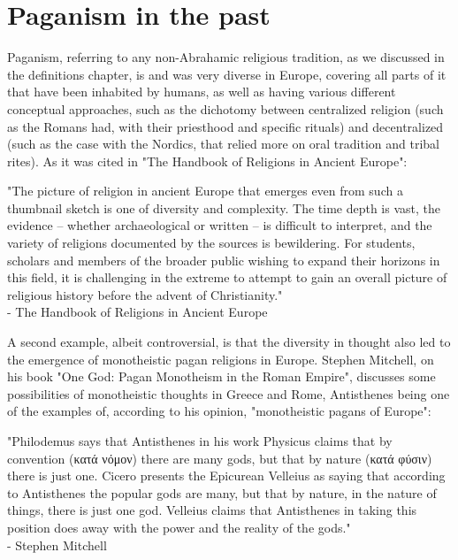 \section{Paganism in the past}
Paganism, referring to any non-Abrahamic religious tradition, as we discussed in the definitions
chapter, is and was very diverse in Europe, covering all parts of it that have been inhabited by
humans, as well as having various different conceptual approaches, such as the dichotomy between
centralized religion (such as the Romans had, with their priesthood and specific rituals) and 
decentralized (such as the case with the Nordics, that relied more on oral tradition and tribal
rites). As it was cited in "The Handbook of Religions in Ancient Europe":

\begin{center}
    \itshape
    \parbox{0.7\textwidth}{
    "The picture of religion in ancient Europe that emerges even from such a thumbnail sketch is
    one of diversity and complexity. The time depth is vast, the evidence – whether archaeological
    or written – is difficult to interpret, and the variety of religions documented by the sources
    is bewildering. For students, scholars and members of the broader public wishing to expand their
    horizons in this field, it is challenging in the extreme to attempt to gain an overall picture of
    religious history before the advent of Christianity."\\
    \normalfont - The Handbook of Religions in Ancient Europe \cite{Christensen2020}
    }
\end{center}

A second example, albeit controversial, is that the diversity in thought also led to the emergence of
monotheistic pagan religions in Europe. Stephen Mitchell, on his book "One God: Pagan Monotheism in the
Roman Empire", discusses some possibilities of monotheistic thoughts in Greece and Rome, Antisthenes
being one of the examples of, according to his opinion, "monotheistic pagans of Europe":

\begin{center}
    \itshape
    \parbox{0.7\textwidth}{
    "Philodemus says that Antisthenes in
    his work Physicus claims that by convention (κατά νόμον) there are many gods, but that
    by nature (κατά φύσιν) there is just one. Cicero presents the Epicurean Velleius as saying
    that according to Antisthenes the popular gods are many, but that by nature, in the nature of things,
    there is just one god. Velleius claims that Antisthenes in taking this position does away with the
    power and the reality of the gods."\\
    \normalfont - Stephen Mitchell \cite{Mitchell2010}
    }
\end{center}


